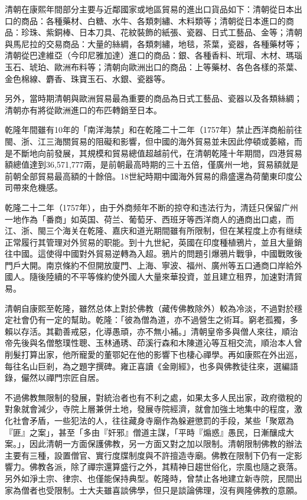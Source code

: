 清朝在康熙年間部分主要与近鄰國家或地區貿易的進出口貨品如下：清朝從日本出口的商品：各種藥材、白糖、水牛、各類刺繡、木料類等；清朝從日本進口的商品：珍珠、紫銅棒、日本刀具、花紋裝飾的紙張、瓷器、日式工藝品、金等；清朝與馬尼拉的交易商品：大量的絲綢，各類刺繡，地毯，茶葉，瓷器，各種藥材等；清朝從巴達維亞（今印尼雅加達）進口的商品：銀、各種香料、玳瑁、木材、瑪瑙玉石、琥珀、歐洲布料等；清朝向歐洲出口的商品：上等藥材、各色各樣的茶葉、金色棉線、麝香、珠寶玉石、水銀、瓷器等。

另外，當時期清朝與歐洲貿易最為重要的商品為日式工藝品、瓷器以及各類絲綢；清朝亦有將從歐洲進口的布匹轉銷至日本。

乾隆年間雖有10年的「南洋海禁」和在乾隆二十二年（1757年）禁止西洋商船前往閩、浙、江三海關貿易的阻礙和影響，但中國的海外貿易並未因此停頓或萎縮，而是不斷地向前發展，其規模和貿易總值超越前代，在清朝乾隆十年期間，四港貿易額總值達到36,571,777兩，是前朝最高時期的三十五倍，僅廣州一地，貿易額就是前朝全部貿易最高額的十餘倍。18世紀時期中國海外貿易的鼎盛還為荷蘭東印度公司帶來危機感。

乾隆二十二年（1757年），由于外商频年不断的掠夺和违法行为，清廷只保留广州一地作為「番商」如英国、荷兰、葡萄牙、西班牙等西洋商人的通商出口處，而江、浙、閩三个海关在乾隆、嘉庆和道光期間雖有所限制，但在某程度上亦有继续正常履行其管理对外贸易的职能。到十九世紀，英國在印度種植鴉片，並且大量銷往中國。這使得中國對外貿易逆轉為入超。鴉片的問題引爆鴉片戰爭，中國戰敗後門戶大開。南京條約不但開放廈門、上海、寧波、福州、廣州等五口通商口岸給外國人。隨後陸續的不平等條約使外國人大量來華投資，並且建立租界，加速對清貿易。

清朝自康熙至乾隆，雖然总体上對於佛教（藏传佛教除外）較為冷淡，不過對於穩定社會仍有一定的幫助。乾隆：「彼為僧為道，亦不過營生之術耳。窮老孤獨，多賴以存活。其勸善戒惡，化導愚頑，亦不無小補。」清朝皇帝多與僧人來往，順治帝先後與名僧憨璞性聰、玉林通琇、茚溪行森和木陳道沁等互相交流，順治本人曾削髮打算出家，他所寵愛的董鄂妃在他的影響下也棲心禪學。再如康熙在外出巡，每往名山巨剎，為之題字撰碑。雍正喜讀《金剛經》，也多與佛教徒往來，選編語錄，儼然以禪門宗匠自居。

不過佛教無限制的發展，對統治者也有不利之處，如果太多人民出家，政府徵稅的對象就會減少，寺院上層兼併土地，發展寺院經濟，就會加強土地集中的程度，激化社會矛盾，一些犯法的人，往往藏身寺廟作為躲避懲罰的手段，某些「聚眾為『匪』之案」，甚至「多由『奸邪』僧道主謀，「平時『煽惑』愚民，日漸釀成大案。」，因此清朝一方面保護佛教，另一方面又對之加以限制。清朝限制佛教的辦法主要有三種，設置僧官、實行度牒制度與不許擅造寺廟。佛教在限制下仍有一定影響力。佛教各派，除了禪宗還算盛行之外，其精神日趨世俗化，宗風也隨之衰落。另外如淨土宗、律宗、也僅能保持典型。乾隆時，曾禁止各地建立新寺院，民間出家為僧者也受限制。士大夫雖喜談佛學，但只是談論佛理，沒有興隆佛教的意願。

